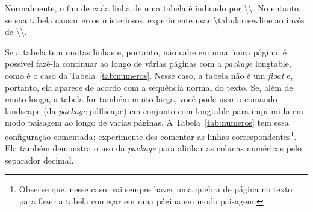 Normalmente, o fim de cada linha de uma tabela é indicado por
\textsf{\textbackslash\textbackslash}. No entanto, se sua tabela causar
erros misteriosos, experimente usar \textsf{\textbackslash{}tabularnewline}
ao invés de \textsf{\textbackslash\textbackslash}.

Se a tabela tem muitas linhas e, portanto, não cabe em uma única página, é
possível fazê-la continuar ao longo de várias páginas com a \textit{package}
\textsf{longtable}, como é o caso da Tabela~\ref{tab:numeros}. Nesse caso,
a tabela não é um \textit{float} e, portanto, ela aparece de acordo com a
sequência normal do texto. Se, além de muito longa, a tabela for também
muito larga, você pode usar o comando \textsf{landscape} (da
\textit{package} \textsf{pdflscape}) em conjunto com \textsf{longtable}
para imprimi-la em modo paisagem ao longo de várias páginas. A
Tabela~\ref{tab:numeros} tem essa configuração comentada; experimente
des-comentar as linhas correspondentes\footnote{Observe que, nesse caso,
vai sempre haver uma quebra de página no texto para fazer a tabela
começar em uma página em modo paisagem.}. Ela também demonstra o uso
da \emph{package}  para alinhar as colunas numéricas pelo
separador decimal.


\bgroup
{}

